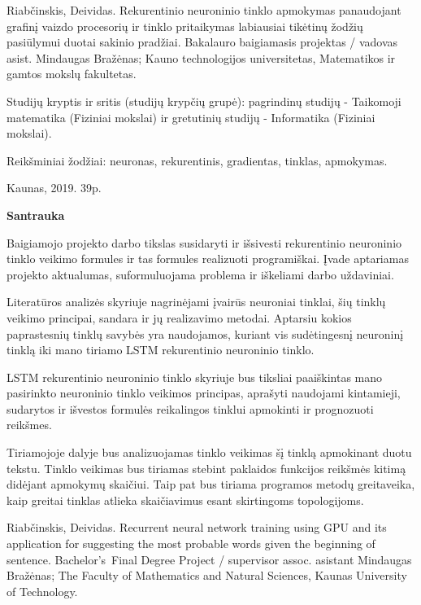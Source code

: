 Riabčinskis, Deividas. Rekurentinio neuroninio tinklo apmokymas panaudojant grafinį vaizdo procesorių ir tinklo pritaikymas labiausiai tikėtinų žodžių pasiūlymui duotai sakinio pradžiai. Bakalauro baigiamasis projektas / vadovas asist. Mindaugas Bražėnas; Kauno technologijos universitetas, Matematikos ir gamtos mokslų fakultetas.

Studijų kryptis ir sritis (studijų krypčių grupė): pagrindinų studijų - Taikomoji matematika (Fiziniai mokslai) ir gretutinių studijų - Informatika (Fiziniai mokslai).

Reikšminiai žodžiai: neuronas, rekurentinis, gradientas, tinklas, apmokymas.

Kaunas, 2019. 39p.%

\begin{center}
\textbf{Santrauka}
\end{center}

Baigiamojo projekto darbo tikslas susidaryti ir išsivesti rekurentinio neuroninio tinklo vei\-ki\-mo formules ir tas formules realizuoti programiškai. Įvade aptariamas projekto aktualumas, suformuluojama problema ir iškeliami darbo uždaviniai.

Literatūros analizės skyriuje nagrinėjami įvairūs neuroniai tinklai, šių tinklų veikimo principai, sandara ir jų realizavimo metodai. Aptarsiu kokios paprastesnių tinklų savybės yra naudojamos, kuriant vis sudėtingesnį neuroninį tinklą iki mano tiriamo LSTM rekurentinio neuroninio tinklo.

LSTM rekurentinio neuroninio tinklo skyriuje bus tiksliai paaiškintas mano pasirinkto neuroninio tinklo veikimos principas, aprašyti naudojami kintamieji, sudarytos ir išvestos formulės reikalingos tinklui apmokinti ir prognozuoti reikšmes.

Tiriamojoje dalyje bus analizuojamas tinklo veikimas šį tinklą apmokinant duotu tekstu. Tinklo veikimas bus tiriamas stebint paklaidos funkcijos reikšmės kitimą didėjant apmokymų skaičiui. Taip pat bus tiriama programos metodų greitaveika, kaip greitai tinklas atlieka skaičiavimus esant skirtingoms topologijoms.



\clearpage

Riabčinskis, Deividas. Recurrent neural network training using GPU and its application for suggesting the most probable words given the beginning of sentence. Bachelor's Final Degree Project / supervisor assoc. asistant Mindaugas Bražėnas; The Faculty of Mathematics and Natural Sciences, Kaunas University of Technology.

